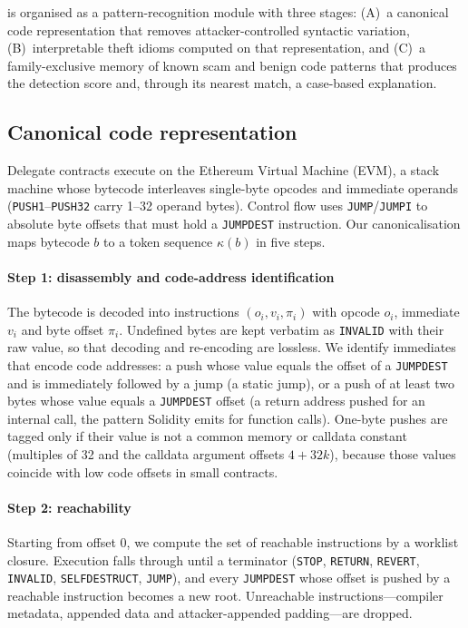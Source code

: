 \dn{} is organised as a pattern-recognition module with three stages: (A)~a canonical code representation that removes attacker-controlled syntactic variation, (B)~interpretable theft idioms computed on that representation, and (C)~a family-exclusive memory of known scam and benign code patterns that produces the detection score and, through its nearest match, a case-based explanation.

\subsection{Canonical code representation}
\label{sec:canon}
Delegate contracts execute on the Ethereum Virtual Machine (EVM), a stack machine whose bytecode interleaves single-byte opcodes and immediate operands (\texttt{PUSH1}--\texttt{PUSH32} carry 1--32 operand bytes). Control flow uses \texttt{JUMP}/\texttt{JUMPI} to absolute byte offsets that must hold a \texttt{JUMPDEST} instruction. Our canonicalisation maps bytecode $b$ to a token sequence $\kappa(b)$ in five steps.

\paragraph{Step 1: disassembly and code-address identification} The bytecode is decoded into instructions $(o_i,v_i,\pi_i)$ with opcode $o_i$, immediate $v_i$ and byte offset $\pi_i$. Undefined bytes are kept verbatim as \texttt{INVALID} with their raw value, so that decoding and re-encoding are lossless. We identify immediates that encode code addresses: a push whose value equals the offset of a \texttt{JUMPDEST} and is immediately followed by a jump (a static jump), or a push of at least two bytes whose value equals a \texttt{JUMPDEST} offset (a return address pushed for an internal call, the pattern Solidity emits for function calls). One-byte pushes are tagged only if their value is not a common memory or calldata constant (multiples of 32 and the calldata argument offsets $4+32k$), because those values coincide with low code offsets in small contracts.

\paragraph{Step 2: reachability} Starting from offset $0$, we compute the set of reachable instructions by a worklist closure. Execution falls through until a terminator (\texttt{STOP}, \texttt{RETURN}, \texttt{REVERT}, \texttt{INVALID}, \texttt{SELFDESTRUCT}, \texttt{JUMP}), and every \texttt{JUMPDEST} whose offset is pushed by a reachable instruction becomes a new root. Unreachable instructions---compiler metadata, appended data and attacker-appended padding---are dropped.

